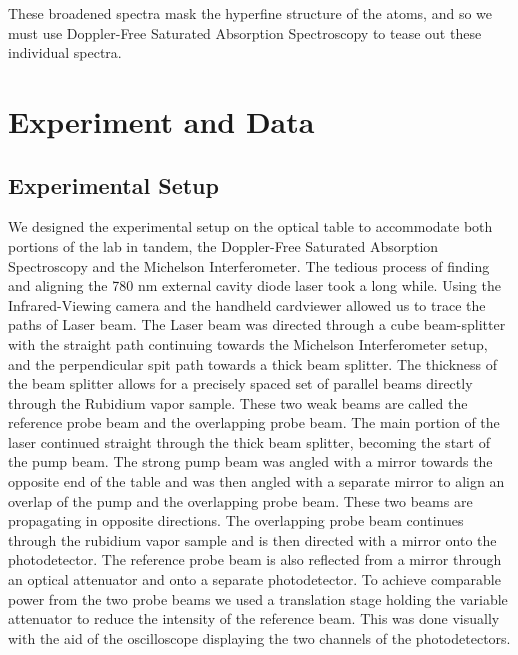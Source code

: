 \documentclass[12pt]{article}
\begin{document}
These broadened spectra mask the hyperfine structure of the atoms, and so we must use Doppler-Free Saturated Absorption Spectroscopy to tease out these individual spectra.



\section*{Experiment and Data}

\subsection*{Experimental Setup}
We designed the experimental setup on the optical table to accommodate both portions of the lab in tandem, the Doppler-Free Saturated Absorption Spectroscopy and the Michelson Interferometer. The tedious process of finding and aligning the 780 nm external cavity diode laser took a long while. Using the Infrared-Viewing camera and the handheld cardviewer allowed us to trace the paths of Laser beam. The Laser beam was directed through a cube beam-splitter with the straight path continuing towards the Michelson Interferometer setup, and the perpendicular spit path towards a thick beam splitter. The thickness of the beam splitter allows for a precisely spaced set of parallel beams directly through the Rubidium vapor sample. These two weak beams are called the reference probe beam and the overlapping probe beam. The main portion of the laser continued straight through the thick beam splitter, becoming the start of the pump beam. The strong pump beam was angled with a mirror towards the opposite end of the table and was then angled with a separate mirror to align an overlap of the pump and the overlapping probe beam. These two beams are propagating in opposite directions. The overlapping probe beam continues through the rubidium vapor sample and is then directed with a mirror onto the photodetector. The reference probe beam is also reflected from a mirror through an optical attenuator and onto a separate photodetector. To achieve comparable power from the two probe beams we used a translation stage holding the variable attenuator to reduce the intensity of the reference beam. This was done visually with the aid of the oscilloscope  displaying the two channels of the photodetectors. 
\end{document}
